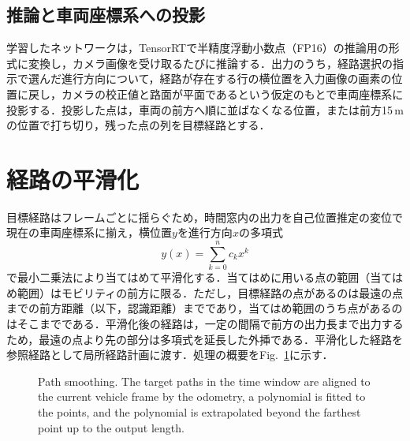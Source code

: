\subsection{推論と車両座標系への投影}
\label{sec:inference}
学習したネットワークは，TensorRTで半精度浮動小数点（FP16）の推論用の形式に変換し，カメラ画像を受け取るたびに推論する．出力のうち，経路選択の指示で選んだ進行方向について，経路が存在する行の横位置を入力画像の画素の位置に戻し，カメラの校正値と路面が平面であるという仮定のもとで車両座標系に投影する．投影した点は，車両の前方へ順に並ばなくなる位置，または前方15\,mの位置で打ち切り，残った点の列を目標経路とする．

\section{経路の平滑化}
\label{sec:path_smoother}
目標経路はフレームごとに揺らぐため，時間窓内の出力を自己位置推定の変位で現在の車両座標系に揃え，横位置$y$を進行方向$x$の多項式
\begin{equation}
  y(x) = \sum_{k=0}^{n} c_k x^k
  \label{eq:smooth}
\end{equation}
で最小二乗法により当てはめて平滑化する．当てはめに用いる点の範囲（当てはめ範囲）はモビリティの前方に限る．ただし，目標経路の点があるのは最遠の点までの前方距離（以下，認識距離）までであり，当てはめ範囲のうち点があるのはそこまでである．平滑化後の経路は，一定の間隔で前方の出力長まで出力するため，最遠の点より先の部分は多項式を延長した外挿である．平滑化した経路を参照経路として局所経路計画に渡す．処理の概要をFig.~\ref{fig:smooth}に示す．

\begin{figure}[H]
  \centering
  
  \caption[Path smoothing with a time window.]{Path smoothing. The target paths in the time window are aligned to the current vehicle frame by the odometry, a polynomial is fitted to the points, and the polynomial is extrapolated beyond the farthest point up to the output length.}
  \label{fig:smooth}
\end{figure}

